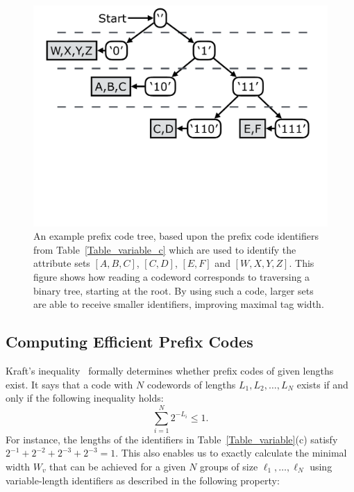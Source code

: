 \begin{figure}[t!] 
\begin{minipage}{1\linewidth}
\includegraphics[trim={0 10cm 0 0}, clip, width=\linewidth]{figures/code_tree}
\end{minipage} 
\caption{An example prefix code tree, based upon the prefix code identifiers from Table~\ref{Table_variable_c} which are used to identify the attribute sets $[A,B,C]$, $[C,D]$, $[E,F]$ and $[W,X,Y,Z]$. This figure shows how reading a codeword corresponds to traversing a binary tree, starting at the root. By using such a code, larger sets are able to receive smaller identifiers, improving maximal  tag width.}
\label{fig:code_tree}
\end{figure}

\subsection{Computing Efficient Prefix Codes}
Kraft's inequality~\cite{abramson} formally determines whether prefix
codes of given lengths exist.  It says that a code with $N$ codewords
of lengths $L_1, L_2, \ldots, L_N$ exists if and only if the following
inequality holds:
$$ \sum_{i = 1}^{N}{2^{-L_i}} \le 1. $$
%
For instance, the lengths of the identifiers in
Table~\ref{Table_variable}(c) 
satisfy $2^{-1} + 2^{-2} + 2^{-3} + 2^{-3} = 1$.
%
This also enables us to exactly calculate the minimal width $W_{v}$
that can be achieved for a given $N$ groups of size $\ell_1,
\ldots, \ell_N$ using variable-length identifiers as described in the
following property:

